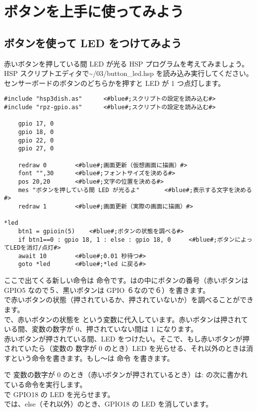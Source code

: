 \section{ボタンを上手に使ってみよう}
\subsection{ボタンを使って LED をつけてみよう}
赤いボタンを押している間 LED が光る HSP プログラムを考えてみましょう。HSP スクリプトエディタで\textasciitilde /03/button\_led.hsp を読み込み実行してください。センサーボードのボタンのどちらかを押すと LED が 1 つ点灯します。\\

\begin{lstlisting}[caption=button\_led.hsp,label=button_led.hsp]
#include "hsp3dish.as"		<#blue#;スクリプトの設定を読み込む#>
#include "rpz-gpio.as"		<#blue#;スクリプトの設定を読み込む#>

	gpio 17, 0
	gpio 18, 0
	gpio 22, 0
	gpio 27, 0
   
	redraw 0		<#blue#;画面更新（仮想画面に描画）#>
	font "",30		<#blue#;フォントサイズを決める#>
	pos 20,20		<#blue#;文字の位置を決める#>
	mes "ボタンを押している間 LED が光るよ"		<#blue#;表示する文字を決める#>
	redraw 1		<#blue#;画面更新（実際の画面に描画）#>

*led
	btn1 = gpioin(5) 	<#blue#;ボタンの状態を調べる#>
	if btn1==0 : gpio 18, 1 : else : gpio 18, 0 	<#blue#;ボタンによってLEDを消灯/点灯#>
	await 10 		<#blue#;0.01 秒待つ#>
	goto *led 		<#blue#;*led に戻る#>
\end{lstlisting}

ここで出てくる新しい命令は  命令です。は\code{()}の中にボタンの番号（赤いボタンは
GPIO5 なので５、黒いボタンは GPIO ６なので６）を書きます。\\

で赤いボタンの状態（押されているか、押されていないか）を調べることができます。\\
で、赤いボタンの状態を  という変数に代入しています。赤いボタンは押されている間、変数の数字が 0、押されていない間は 1 になります。\\

赤いボタンが押されている間、LED をつけたい。そこで、もし赤いボタンが押されていたら（変数の
数字が 0 のとき）LED を光らせる、それ以外のときは消すという命令を書きます。もし～は  命令
を書きます。

 で  変数の数字が 0 のとき（赤いボタンが押されているとき）は\code{ }: の次に書かれている命令を実行します。\\
 で GPIO18 の LED を光らせます。\\
 では、else（それ以外）のとき、GPIO18 の LED を消しています。\\

